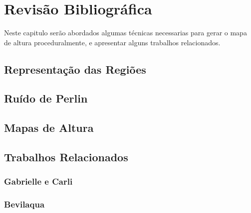 \chapter{Revisão Bibliográfica}
Neste capitulo serão abordados algumas técnicas necessarias para gerar o mapa
de altura proceduralmente, e apresentar alguns trabalhos relacionados.

\section{Representação das Regiões}

\section{Ruído de Perlin}

\section{Mapas de Altura}

\section{Trabalhos Relacionados}

\subsection{Gabrielle e Carli}

\subsection{Bevilaqua}